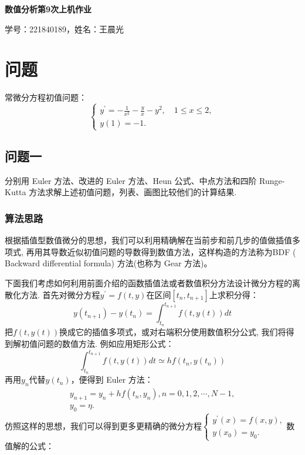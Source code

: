 \documentclass[UTF8,ctexart,a4paper,11pt,openany]{article}
\theoremstyle{definition}
\begin{document}
\begin{center}
{\huge \textbf{数值分析第9次上机作业}}

{\large 学号：221840189，姓名：王晨光}
\end{center}

\section{问题}
    常微分方程初值问题：$$\left\{\begin{array}{l}y^{\prime}=-\frac{1}{x^{2}}-\frac{y}{x}-y^{2}, \quad 1 \leq x \leq 2, \\ y(1)=-1 .\end{array}\right.$$

    \subsection{问题一}
    分别用 Euler 方法、改进的 Euler 方法、Heun 公式、中点方法和四阶 Runge-Kutta 方法求解上述初值问题，列表、画图比较他们的计算结果.

        \subsubsection{算法思路}

        根据插值型数值微分的思想，我们可以利用精确解在当前步和前几步的值做插值多项式, 再用其导数近似初值问题的导数得到数值方法，这样构造的方法称为BDF ( Backward differential formula) 方法(也称为 Gear 方法)。\par

        下面我们考虑如何利用前面介绍的函数插值法或者数值积分方法设计微分方程的离散化方法. 首先对微分方程$y^{\prime}=f(t,y)$在区间$[t_n,t_{n+1}]$上求积分得：$$y\left(t_{n+1}\right)-y\left(t_{n}\right)=\int_{t_{n}}^{t_{n+1}} f(t, y(t)) d t$$把$f(t,y(t))$换成它的插值多项式，或对右端积分使用数值积分公式, 我们将得到解初值问题的数值方法. 例如应用矩形公式：$$\int_{t_{n}}^{t_{n+1}} f(t, y(t)) d t \simeq h f\left(t_{n}, y\left(t_{n}\right)\right)$$再用$y_n$代替$y(t_n)$，便得到 Euler 方法：$$\begin{array}{c}y_{n+1}=y_{n}+h f\left(t_{n}, y_{n}\right), n=0,1,2, \cdots, N-1, \\ y_{0}=\eta .\end{array}$$ 仿照这样的思想，我们可以得到更多更精确的微分方程$\left\{\begin{array}{l}y^{\prime}(x)=f(x, y), \\ y(x_0)=y_0 .\end{array}\right.$数值解的公式：
\end{document}
